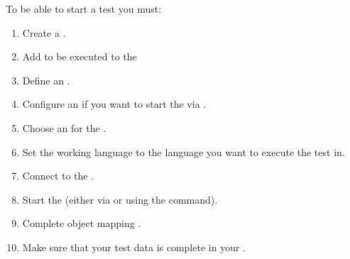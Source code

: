 % 
%
%
To be able to start a test you must:

\begin{enumerate}
\item Create a \gdsuite{} .
\item Add \gdcases{} to be executed to the \gdsuite{} 
\item Define an \gdaut{} .
\item Configure an \gdaut{}  if you want to start the \gdaut{} via \jb{}.  
\item Choose an \gdaut{} for the \gdsuite{} .
\item Set the working language to the language you want to execute the test in.
\item Connect to the \gdagent{} .
\item Start the \gdaut{}  (either via \jb{} or using the  command). 
\item Complete object mapping .
\item Make sure that your test data is complete in your \gdcases{}.
\end{enumerate}







